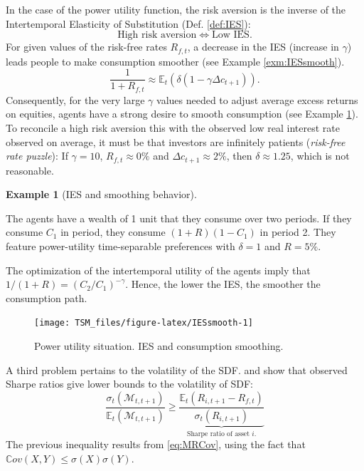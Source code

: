 \documentclass[
  12pt,
]{book}
\theoremstyle{definition}
\theoremstyle{definition}
\newtheorem{example}{Example}[chapter]
\theoremstyle{definition}
\theoremstyle{definition}
\theoremstyle{remark}
\begin{document}
In the case of the power utility function, the risk aversion is the inverse of the Intertemporal Elasticity of Substitution (Def. \ref{def:IES}):
\[
\mbox{High risk aversion} \Leftrightarrow \mbox{Low IES}.
\]
For given values of the risk-free rates \(R_{f,t}\), a decrease in the IES (increase in \(\gamma\)) leads people to make consumption smoother (see Example \ref{exm:IESsmooth}).
\[
\frac{1}{1+R_{f,t}} \approx \mathbb{E}_t(\delta (1 - \gamma \Delta c_{t+1})).
\]
Consequently, for the very large \(\gamma\) values needed to adjust average excess returns on equities, agents have a strong desire to smooth consumption (see Example \ref{exm:IESsmoothing}). To reconcile a high risk aversion this with the observed low real interest rate observed on average, it must be that investors are infinitely patients (\emph{risk-free rate puzzle}):
If \(\gamma=10\), \(R_{f,t} \approx 0\%\) and \(\Delta c_{t+1} \approx 2\%\), then \(\delta \approx 1.25\), which is not reasonable.

\begin{example}[IES and smoothing behavior]
\protect\hypertarget{exm:IESsmoothing}{}\label{exm:IESsmoothing}

The agents have a wealth of 1 unit that they consume over two periods. If they consume \(C_1\) in period, they consume \((1+R)(1-C_1)\) in period 2. They feature power-utility time-separable preferences with \(\delta=1\) and \(R=5\%\).

The optimization of the intertemporal utility of the agents imply that \(1/(1+R)=(C_2/C_1)^{-\gamma}\). Hence, the lower the IES, the smoother the consumption path.

\begin{figure}
\texttt{[image: TSM\_files/figure-latex/IESsmooth-1]} \caption{Power utility situation. IES and consumption smoothing.}\label{fig:IESsmooth}
\end{figure}

\end{example}

A third problem pertains to the volatility of the SDF. \citet{Grossman_Shiller_1981} and \citet{Hansen_Jagannathan_1991} show that observed Sharpe ratios give lower bounds to the volatility of SDF:
\[
\frac{\sigma_t(\mathcal{M}_{t,t+1})}{\mathbb{E}_t(\mathcal{M}_{t,t+1})} \ge \underbrace{\frac{\mathbb{E}_t(R_{i,t+1}-R_{f,t})}{\sigma_t(R_{i,t+1})}}_{\mbox{Sharpe ratio of asset $i$.}}
\]
The previous inequality results from \eqref{eq:MRCov}, using the fact that \(\mathbb{C}ov(X,Y) \le \sigma(X)\sigma(Y)\).
\end{document}
